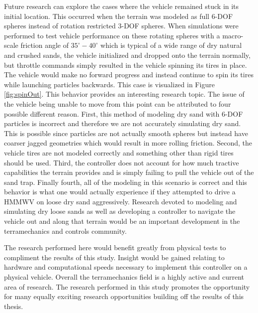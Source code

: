\documentclass[12pt,onecolumn]{report}
\begin{document}
Future research can explore the cases where the vehicle remained stuck in its initial location. This occurred when the terrain was modeled as full 6-DOF spheres instead of rotation restricted 3-DOF spheres. When simulations were performed to test vehicle performance on these rotating spheres with a macro-scale friction angle of $35^\circ-40^\circ$ which is typical of a wide range of dry natural and crushed sands, the vehicle initialized and dropped onto the terrain normally, but throttle commands simply resulted in the vehicle spinning its tires in place. The vehicle would make no forward progress and instead continue to spin its tires while launching particles backwards. This case is visualized in Figure \ref{fig:spinOut}. This behavior provides an interesting research topic. The issue of the vehicle being unable to move from this point can be attributed to four possible different reason. First, this method of modeling dry sand with 6-DOF particles is incorrect and therefore we are not accurately simulating dry sand. This is possible since particles are not actually smooth spheres but instead have coarser jagged geometries which would result in more rolling friction. Second, the vehicle tires are not modeled correctly and something other than rigid tires should be used. Third, the controller does not account for how much tractive capabilities the terrain provides and is simply failing to pull the vehicle out of the sand trap. Finally fourth, all of the modeling in this scenario is correct and this behavior is what one would actually experience if they attempted to drive a HMMWV on loose dry sand aggressively. Research devoted to modeling and simulating dry loose sands as well as developing a controller to navigate the vehicle out and along that terrain would be an important development in the terramechanics and controls community. 

The research performed here would benefit greatly from physical tests to compliment the results of this study. Insight would be gained relating to hardware and computational speeds necessary to implement this controller on a physical vehicle. Overall the terramechanics field is a highly active and current area of research. The research performed in this study promotes the opportunity for many equally exciting research opportunities building off the results of this thesis.


\newpage
\titlespacing{\chapter}{0in}{-20pt}{0.2in}

\begin{singlespacing}


\end{singlespacing}

\end{document}
